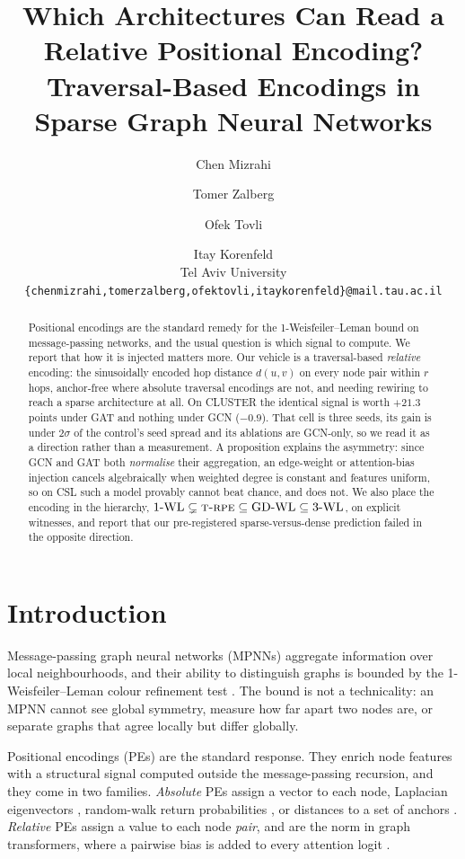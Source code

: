 \documentclass[11pt]{article}
\title{Which Architectures Can Read a Relative Positional Encoding?\\
Traversal-Based Encodings in Sparse Graph Neural Networks}
\author{
  Chen Mizrahi \and Tomer Zalberg \and Ofek Tovli \and Itay Korenfeld \\
  Tel Aviv University \\
  \texttt{\small\{chenmizrahi,tomerzalberg,ofektovli,itaykorenfeld\}@mail.tau.ac.il}
}
\begin{document}
\maketitle

\begin{abstract}
Positional encodings are the standard remedy for the 1-Weisfeiler--Leman bound on
message-passing networks, and the usual question is which signal to compute. We report that how
it is injected matters more. Our vehicle is a traversal-based \emph{relative} encoding: the
sinusoidally encoded hop distance $d(u,v)$ on every node pair within $r$ hops, anchor-free where
absolute traversal encodings are not, and needing rewiring to reach a sparse architecture at
all. On CLUSTER the identical signal is worth $+21.3$ points under GAT and nothing under GCN
($-0.9$). That cell is three seeds, its gain is under $2\sigma$ of the control's seed spread and
its ablations are GCN-only, so we read it as a direction rather than a measurement. A
proposition explains the asymmetry: since GCN and GAT both \emph{normalise} their aggregation,
an edge-weight or attention-bias injection cancels algebraically when weighted degree is
constant and features uniform, so on CSL such a model provably cannot beat chance, and does
not. We also place the encoding in the hierarchy,
$\text{1-WL}\subsetneq\textsc{t-rpe}\subseteq\text{GD-WL}\subseteq\text{3-WL}$, on explicit
witnesses, and report that our pre-registered sparse-versus-dense prediction failed in the
opposite direction.
\end{abstract}

\section{Introduction}
\label{sec:intro}

Message-passing graph neural networks (MPNNs) aggregate information over local neighbourhoods,
and their ability to distinguish graphs is bounded by the 1-Weisfeiler--Leman colour refinement
test \citep{xu2019gin,morris2019wlgo}. The bound is not a technicality: an MPNN cannot see
global symmetry, measure how far apart two nodes are, or separate graphs that agree locally but
differ globally.

Positional encodings (PEs) are the standard response. They enrich node features with a
structural signal computed outside the message-passing recursion, and they come in two
families. \emph{Absolute} PEs assign a vector to each node, Laplacian eigenvectors
\citep{dwivedi2023benchmarking,dwivedi2021generalization}, random-walk return probabilities
\citep{dwivedi2022lspe}, or distances to a set of anchors
\citep{you2019pgnn,li2020distance}. \emph{Relative} PEs assign a value to each node
\emph{pair}, and are the norm in graph transformers, where a pairwise bias is added to every
attention logit \citep{ying2021graphormer,rampasek2022gps}.
\end{document}
